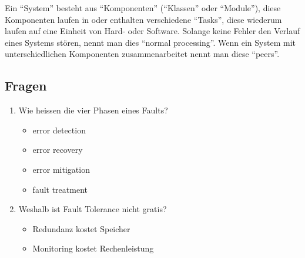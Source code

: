 Ein ``System'' besteht aus ``Komponenten'' (``Klassen'' oder ``Module''), diese Komponenten laufen in oder enthalten verschiedene ``Tasks'', diese wiederum laufen auf eine Einheit von Hard- oder Software. Solange keine Fehler den Verlauf eines Systems stören, nennt man dies ``normal processing''. Wenn ein System mit unterschiedlichen Komponenten zusammenarbeitet nennt man diese ``peers''.



\subsection{Fragen}

\begin{enumerate}
	\item Wie heissen die vier Phasen eines Faults?
	\begin{itemize}
		\item error detection
		\item error recovery
		\item error mitigation
		\item fault treatment
	\end{itemize}

	\item Weshalb ist Fault Tolerance nicht gratis?
	\begin{itemize}
		\item Redundanz kostet Speicher
		\item Monitoring kostet Rechenleistung
	\end{itemize}

\end{enumerate}

